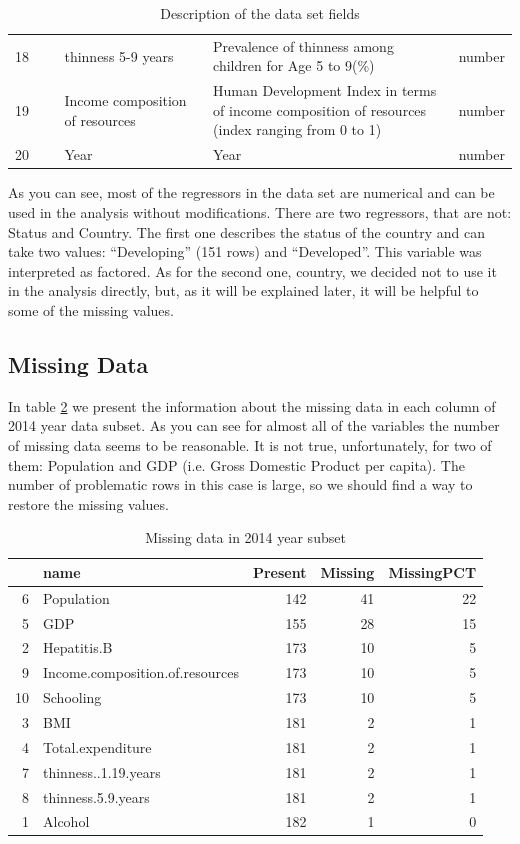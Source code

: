 \begin{table}
\begin{tabular}{p{0.1\linewidth} | p{0.3\linewidth}p{0.5\linewidth}p{0.1\linewidth}}
    18 & thinness 5-9 years & Prevalence of thinness among children for Age 5 to 9(\%) & number \\
    19 & Income composition of resources & Human Development Index in terms of income composition of resources (index ranging from 0 to 1) & number \\
    20 & Year                     & Year & number \\
    \hline
  \end{tabular}
  \caption{Description of the data set fields}
  \label{tab:description}
\end{table}


As you can see, most of the regressors in the data set are numerical and can be used in the analysis without modifications. There are two regressors, that are not: Status and Country. The first one describes the status of the country and can take two values: ``Developing'' (151 rows) and ``Developed''. This variable was interpreted as factored. As for the second one, country, we decided not to use it in the analysis directly, but, as it will be explained later, it will be helpful to some of the missing values.

\subsection{Missing Data}
\label{sec:missing-data}

In table \ref{tab:missing} we present the information about the missing data in each column of 2014 year data subset. As you can see for almost all of the variables the number of missing data seems to be reasonable. It is not true, unfortunately, for two of them: Population and GDP (i.e. Gross Domestic Product per capita). The number of problematic rows in this case is large, so we should find a way to restore the missing values.

\begin{table}[ht]
\centering
\begin{tabular}{rlrrr}
  \hline
 & name & Present & Missing & MissingPCT \\ 
  \hline
6 & Population & 142 &  41 &  22 \\ 
  5 & GDP & 155 &  28 &  15 \\ 
  2 & Hepatitis.B & 173 &  10 &   5 \\ 
  9 & Income.composition.of.resources & 173 &  10 &   5 \\ 
  10 & Schooling & 173 &  10 &   5 \\ 
  3 & BMI & 181 &   2 &   1 \\ 
  4 & Total.expenditure & 181 &   2 &   1 \\ 
  7 & thinness..1.19.years & 181 &   2 &   1 \\ 
  8 & thinness.5.9.years & 181 &   2 &   1 \\ 
  1 & Alcohol & 182 &   1 &   0 \\ 
   \hline
\end{tabular}
\caption{Missing data in 2014 year subset}
\label{tab:missing}
\end{table}

